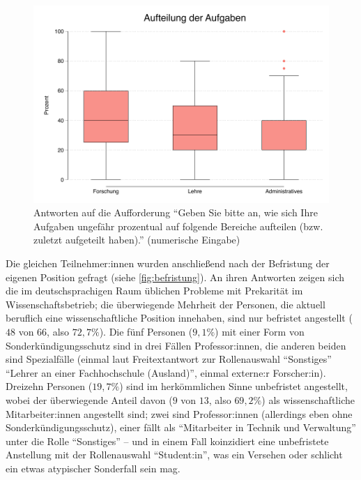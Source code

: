 \documentclass{scrartcl}
\begin{document}
\begin{figure}[ht]
   \includegraphics[width=1\textwidth]{aufteilung.pdf}
   \caption{Antworten auf die Aufforderung \enquote{Geben Sie bitte an, wie sich Ihre Aufgaben ungefähr prozentual auf folgende Bereiche aufteilen (bzw. zuletzt aufgeteilt haben).} (numerische Eingabe)}
   \label{fig:aufteilung}
\end{figure}

Die gleichen Teilnehmer:innen wurden anschließend nach der Befristung der eigenen Position gefragt (siehe \autoref{fig:befristung}).
An ihren Antworten zeigen sich die im deutschsprachigen Raum üblichen Probleme mit Prekarität im Wissenschaftsbetrieb; die überwiegende Mehrheit der Personen, die aktuell beruflich eine wissenschaftliche Position innehaben, sind nur befristet angestellt ($48$ von $66$, also $72,7\%$).
Die fünf Personen ($9,1\%$) mit einer Form von Sonderkündigungsschutz sind in drei Fällen Professor:innen, die anderen beiden sind Spezialfälle (einmal laut Freitextantwort zur Rollenauswahl \enquote{Sonstiges} \enquote{Lehrer an einer Fachhochschule (Ausland)}, einmal externe:r Forscher:in).
Dreizehn Personen ($19,7\%$) sind im herkömmlichen Sinne unbefristet angestellt, wobei der überwiegende Anteil davon ($9$ von $13$, also $69,2\%$) als wissenschaftliche Mitarbeiter:innen angestellt sind; zwei sind Professor:innen (allerdings eben ohne Sonderkündigungsschutz), einer fällt als \enquote{Mitarbeiter in Technik und Verwaltung} unter die Rolle \enquote{Sonstiges} -- und in einem Fall koinzidiert eine unbefristete Anstellung mit der Rollenauswahl \enquote{Student:in}, was ein Versehen oder schlicht ein etwas atypischer Sonderfall sein mag.
\end{document}
